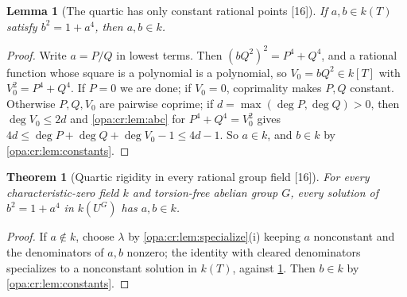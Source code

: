 \documentclass[11pt,oneside]{article}
\numberwithin{equation}{section}
\newtheorem{theorem}{Theorem}[section]
\newtheorem{lemma}[lemma]{Lemma}
\theoremstyle{definition}
\theoremstyle{remark}
\newcommand{\src}[1]{\textup{\textsf{\small[#1]}}}
\begin{document}
\begin{lemma}[The quartic has only constant rational points \src{16}]\label{opa:cr:lem:quarticone}
If $a,b\in k(T)$ satisfy $b^2=1+a^4$, then $a,b\in k$.
\end{lemma}
\begin{proof}
Write $a=P/Q$ in lowest terms. Then $(bQ^2)^2=P^4+Q^4$, and a rational function whose square is a polynomial
is a polynomial, so $V_0=bQ^2\in k[T]$ with $V_0^2=P^4+Q^4$. If $P=0$ we are done; if $V_0=0$, coprimality makes
$P,Q$ constant. Otherwise $P,Q,V_0$ are pairwise coprime; if $d=\max(\deg P,\deg Q)>0$, then $\deg V_0\le2d$ and
\cref{opa:cr:lem:abc} for $P^4+Q^4=V_0^2$ gives $4d\le\deg P+\deg Q+\deg V_0-1\le4d-1$. So $a\in k$, and $b\in k$ by
\cref{opa:cr:lem:constants}.
\end{proof}

\begin{theorem}[Quartic rigidity in every rational group field \src{16}]\label{opa:cr:thm:quarticG}
For every characteristic-zero field $k$ and torsion-free abelian group $G$, every solution of $b^2=1+a^4$ in
$k(U^G)$ has $a,b\in k$.
\end{theorem}
\begin{proof}
If $a\notin k$, choose $\lambda$ by \cref{opa:cr:lem:specialize}(i) keeping $a$ nonconstant and the denominators of
$a,b$ nonzero; the identity with cleared denominators specializes to a nonconstant solution in $k(T)$, against
\cref{opa:cr:lem:quarticone}. Then $b\in k$ by \cref{opa:cr:lem:constants}.
\end{proof}
\end{document}
